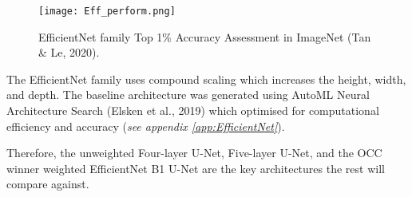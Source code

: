 \documentclass[11pt, a4paper, twoside]{report}
\begin{document}
\begin{figure}[H]
  \centering
  \texttt{[image: Eff\_perform.png]}
  \caption{EfficientNet family Top 1\% Accuracy Assessment in ImageNet (Tan \& Le, 2020).}
  \label{fig:Eff_perform}
\end{figure}

The EfficientNet family uses compound scaling which increases the height, width, and depth. The baseline architecture was generated using AutoML Neural Architecture Search (Elsken et al., 2019) which optimised for computational efficiency and accuracy (\textit{see appendix \ref{app:EfficientNet}}).\\\par

Therefore, the unweighted Four-layer U-Net, Five-layer U-Net, and the OCC winner weighted EfficientNet B1 U-Net are the key architectures the rest will compare against.\\\par

\begin{table}[H]
  \centering
  \label{table:setup}
  \caption{The U-Nets and the variations thereof selected for this study}
\end{table}
\end{document}
